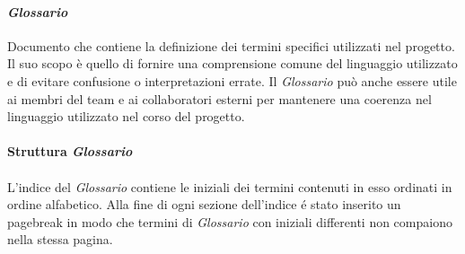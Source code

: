 \paragraph{\textit{Glossario}}
Documento che contiene la definizione dei termini specifici utilizzati nel progetto. 
Il suo scopo è quello di fornire una comprensione comune del linguaggio utilizzato e di evitare confusione o 
interpretazioni errate. Il \textit{Glossario} può anche essere utile ai membri del team e ai collaboratori esterni per 
mantenere una coerenza nel linguaggio utilizzato nel corso del progetto.
\\\\
\textbf{Struttura \textit{Glossario}} 
\\\\
L'indice del \textit{Glossario} contiene le iniziali dei termini contenuti in esso ordinati in ordine alfabetico.
Alla fine di ogni sezione dell'indice é stato inserito un pagebreak in modo che termini di \textit{Glossario} con iniziali differenti non compaiono nella 
stessa pagina.